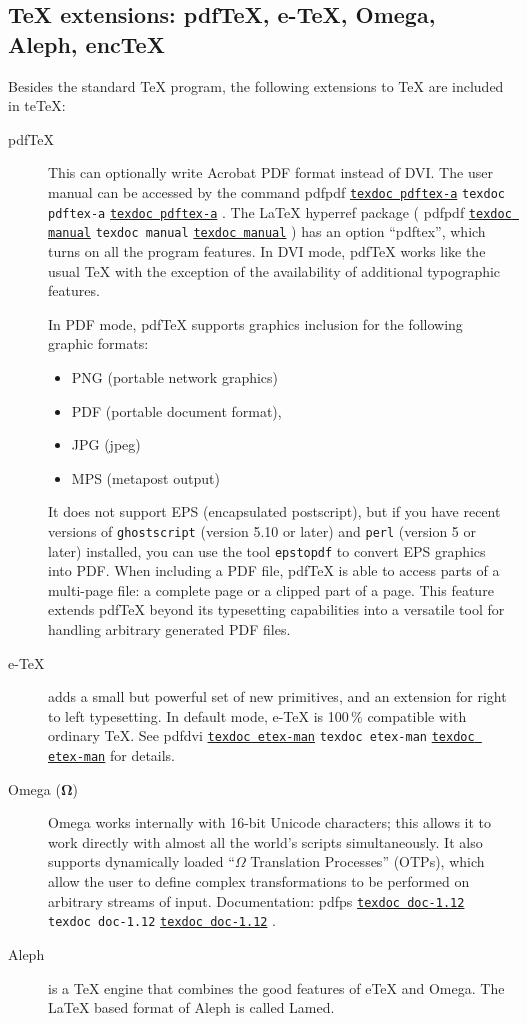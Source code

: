 \documentclass[11pt,a4paper]{article}
\newcommand{\pdfext}{pdf}
\newcommand{\dviext}{dvi}
\let\docext=\pdfext
\let\docext=\dviext
\newcommand{\dlink}[3]{%
  \ifpdf
    \ifx\pdfext#3
      \href{#1/#2.#3}{\texttt{texdoc #2}}%
    \else
      \texttt{texdoc #2}%
    \fi
  \else
     \href{#1/#2.#3}{\mbox{\texttt{texdoc #2}}}%
  \fi}
\newcommand{\teTeX}{\textrm{te}\TeX\xspace}
\begin{document}
\subsection{\TeX{} extensions: pdf\TeX, e-\TeX{}, Omega, Aleph, enc\TeX}
Besides the standard \TeX{} program, the
  following extensions to \TeX{} are included in \teTeX:
\begin{description}
\item [pdf\TeX] This can optionally write Acrobat PDF format instead
  of DVI. The user manual can be accessed by the command
  \dlink{../../../texmf-dist/doc/pdftex/manual}{pdftex-a}{\pdfext}.
  The \LaTeX{} hyperref package
  (\dlink{../../../texmf-dist/doc/latex/hyperref}{manual}{\pdfext})
  has an option ``pdftex'', which turns on all the program features.
  In DVI mode, pdf\TeX{} works like the usual \TeX{} with the
  exception of the availability of additional typographic features.
  
  In PDF mode, pdf\TeX{} supports graphics inclusion for the following
  graphic formats:
  \begin{itemize}
  \item PNG (portable network graphics)
  \item PDF (portable document format),
  \item JPG (jpeg)
  \item MPS (metapost output)
  \end{itemize}
  It does not support EPS (encapsulated postscript), but if you have
  recent versions of \texttt{ghostscript} (version 5.10 or later) and
  \texttt{perl} (version 5 or later) installed, you can use the tool
  \texttt{epstopdf} to convert EPS graphics into PDF. When including a
  PDF file, pdf\TeX{} is able to access parts of a multi-page file: a
  complete page or a clipped part of a page. This feature extends
  pdf\TeX{} beyond its typesetting capabilities into a versatile tool
  for handling arbitrary generated PDF files.

\item [e-\TeX] adds a small but powerful set of new primitives, and an
  extension for right to left typesetting. In default mode, e-\TeX{}
  is 100\,\% compatible with ordinary \TeX.  See
  \dlink{../../../texmf-dist/doc/etex/base}{etex-man}{\docext} for details.

\item [Omega ($\bm \Omega$)] Omega works internally with 16-bit
  Unicode characters; this allows it to work directly with
  almost all the world's scripts simultaneously. It also supports
  dynamically loaded ``$\Omega$ Translation Processes'' (OTPs), which
  allow the user to define complex transformations to be performed on
  arbitrary streams of input. Documentation:
  \dlink{../../../texmf-dist/doc/omega/base}{doc-1.12}{ps}.
\item [Aleph] is a \TeX{} engine that combines the good features of
  e\TeX{} and Omega. The \LaTeX{} based format of Aleph is called
  Lamed.
\end{description}
\end{document}
